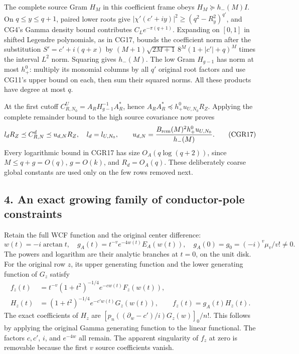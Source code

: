\documentclass[11pt]{article}
\begin{document}
The complete source Gram \(H_M\) in this coefficient frame obeys \(H_M\succeq h_-(M)I\). On \(q\le y\le q+1\), paired lower roots give \(|\chi'(c'+iy)|^2\ge(q^2-R_y^2)^{q'}\), and CG4's Gamma density bound contributes \(C_Le^{-\pi(q+1)}\). Expanding on \([0,1]\) in shifted Legendre polynomials, as in CG17, bounds the coefficient norm after the substitution \(S'=c'+i(q+x)\) by \((M+1)\sqrt{2M+1}\,8^M(1+|c'|+q)^M\) times the interval \(L^2\) norm. Squaring gives \(h_-(M)\). The low Gram \(H_{g-1}\) has norm at most \(h_+^0\): multiply its monomial columns by all \(q'\) original root factors and use CG11's upper bound on each, then sum their squared norms. All these products have degree at most \(q\).

At the first cutoff \(C_{R,N_0}^U=A_RH_{g-1}^{-1}A_R^*\), hence \(A_RA_R^*\preceq h_+^0u_{U,N_0}R_Z\). Applying the complete remainder bound to the high source covariance now proves \[
l_dR_Z\preceq C_{R,N}^d\preceq u_{d,N}R_Z,
\quad l_d=l_{U,N_0},\qquad
u_{d,N}=\frac{B_{\rm rem}(M)^2h_+^0u_{U,N_0}}{h_-(M)}.
\tag{CGR17}
\] Every logarithmic bound in CGR17 has size \(O_A(q\log(q+2))\), since \(M\le q+g=O(q)\), \(g=O(k)\), and \(R_d=O_A(q)\). These deliberately coarse global constants are used only on the few rows removed next.

\subsection{4. An exact growing family of conductor-pole constraints}\label{an-exact-growing-family-of-conductor-pole-constraints}

Retain the full WCF function and the original center difference: \[
w(t)=-i\arctan t,\quad
g_A(t)=t^{-v}e^{-4w(t)}E_A(w(t)),\quad
g_A(0)=g_0=(-i)^v\mu_v/v!\ne0.
\tag{CGR18}
\] The powers and logarithm are their analytic branches at \(t=0\), on the unit disk. For the original row \(z\), its upper generating function and the lower generating function of \(G_z\) satisfy \[
\begin{split}
f_z(t)&=t^{-v}(1+t^2)^{-1/4}e^{-cw(t)}F_z(w(t)),\\
H_z(t)&=(1+t^2)^{-1/4}e^{-c'w(t)}G_z(w(t)),\qquad
f_z(t)=g_A(t)H_z(t).
\end{split}\tag{CGR19}
\] The exact coefficients of \(H_z\) are \([p_n((\partial_w-c')/i)G_z(w)]_0/n!\). This follows by applying the original Gamma generating function to the linear functional. The factors \(c,c'\), \(i\), and \(e^{-4w}\) all remain. The apparent singularity of \(f_z\) at zero is removable because the first \(v\) source coefficients vanish.
\end{document}
